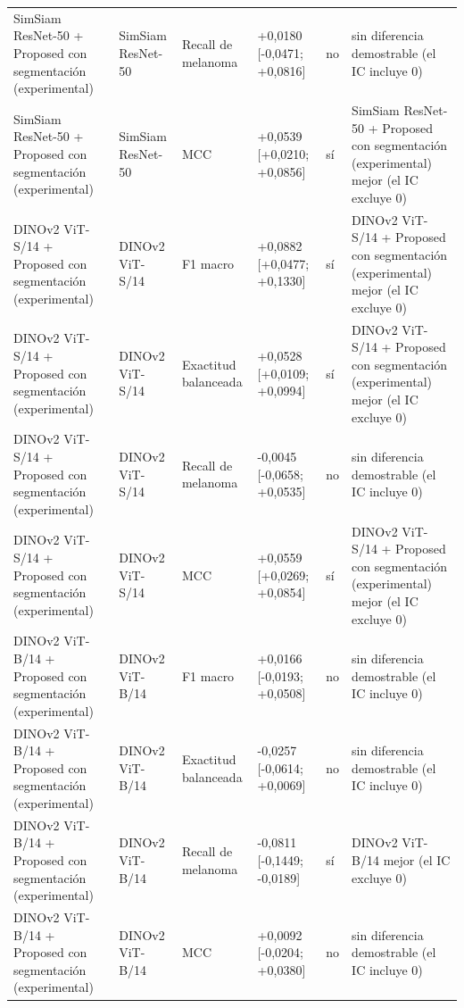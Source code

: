 \begin{longtable}{@{}llllll@{}}
SimSiam ResNet-50 + Proposed con segmentación (experimental) & SimSiam ResNet-50 & Recall de melanoma & +0,0180 [-0,0471; +0,0816] & no & sin diferencia demostrable (el IC incluye 0) \\
SimSiam ResNet-50 + Proposed con segmentación (experimental) & SimSiam ResNet-50 & MCC & +0,0539 [+0,0210; +0,0856] & sí & SimSiam ResNet-50 + Proposed con segmentación (experimental) mejor (el IC excluye 0) \\
DINOv2 ViT-S/14 + Proposed con segmentación (experimental) & DINOv2 ViT-S/14 & F1 macro & +0,0882 [+0,0477; +0,1330] & sí & DINOv2 ViT-S/14 + Proposed con segmentación (experimental) mejor (el IC excluye 0) \\
DINOv2 ViT-S/14 + Proposed con segmentación (experimental) & DINOv2 ViT-S/14 & Exactitud balanceada & +0,0528 [+0,0109; +0,0994] & sí & DINOv2 ViT-S/14 + Proposed con segmentación (experimental) mejor (el IC excluye 0) \\
DINOv2 ViT-S/14 + Proposed con segmentación (experimental) & DINOv2 ViT-S/14 & Recall de melanoma & -0,0045 [-0,0658; +0,0535] & no & sin diferencia demostrable (el IC incluye 0) \\
DINOv2 ViT-S/14 + Proposed con segmentación (experimental) & DINOv2 ViT-S/14 & MCC & +0,0559 [+0,0269; +0,0854] & sí & DINOv2 ViT-S/14 + Proposed con segmentación (experimental) mejor (el IC excluye 0) \\
DINOv2 ViT-B/14 + Proposed con segmentación (experimental) & DINOv2 ViT-B/14 & F1 macro & +0,0166 [-0,0193; +0,0508] & no & sin diferencia demostrable (el IC incluye 0) \\
DINOv2 ViT-B/14 + Proposed con segmentación (experimental) & DINOv2 ViT-B/14 & Exactitud balanceada & -0,0257 [-0,0614; +0,0069] & no & sin diferencia demostrable (el IC incluye 0) \\
DINOv2 ViT-B/14 + Proposed con segmentación (experimental) & DINOv2 ViT-B/14 & Recall de melanoma & -0,0811 [-0,1449; -0,0189] & sí & DINOv2 ViT-B/14 mejor (el IC excluye 0) \\
DINOv2 ViT-B/14 + Proposed con segmentación (experimental) & DINOv2 ViT-B/14 & MCC & +0,0092 [-0,0204; +0,0380] & no & sin diferencia demostrable (el IC incluye 0) \\
\bottomrule
\end{longtable}
\endgroup


